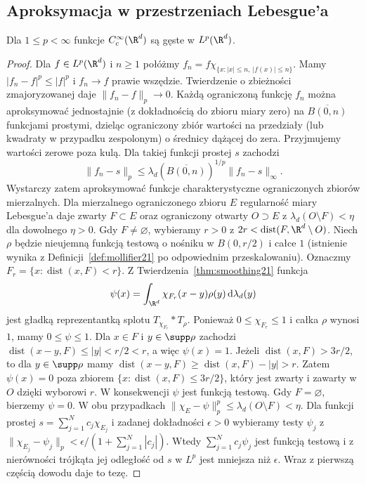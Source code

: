 
\subsection{Aproksymacja w przestrzeniach Lebesgue'a}

\begin{twierdzenie}
\label{thm:dt-test-density}
Dla $1\le p<\infty$ funkcje $C_c^\infty(\R^d)$
są gęste w $L^p(\R^d)$.
\end{twierdzenie}
\begin{proof}
Dla $f\in L^p(\R^d)$ i $n\ge1$ połóżmy
$f_n=f\chi_{\{x:|x|\le n,\ |f(x)|\le n\}}$.
Mamy $|f_n-f|^p\le |f|^p$ i $f_n\to f$ prawie wszędzie.
Twierdzenie o zbieżności zmajoryzowanej daje
$\|f_n-f\|_p\to0$.
Każdą ograniczoną funkcję $f_n$ można aproksymować
jednostajnie (z dokładnością do zbioru miary zero)
na $\overline{B(0,n)}$ funkcjami prostymi, dzieląc
ograniczony zbiór wartości na przedziały (lub kwadraty
w przypadku zespolonym) o średnicy dążącej do zera.
Przyjmujemy wartości zerowe poza kulą. Dla takiej
funkcji prostej $s$ zachodzi
\[
 \|f_n-s\|_p\le
 \lambda_d(\overline{B(0,n)})^{1/p}\|f_n-s\|_\infty.
\]
Wystarczy zatem aproksymować funkcje charakterystyczne
ograniczonych zbiorów mierzalnych.
Dla mierzalnego ograniczonego zbioru $E$ regularność
miary Lebesgue'a daje zwarty $F\subset E$ oraz
ograniczony otwarty $O\supset E$ z
$\lambda_d(O\setminus F)<\eta$ dla dowolnego $\eta>0$.
Gdy $F\ne\varnothing$, wybieramy $r>0$ z
$2r<\operatorname{dist}(F,\R^d\setminus O)$.
Niech $\rho$ będzie nieujemną funkcją testową o nośniku
w $B(0,r/2)$ i całce $1$ (istnienie wynika z
Definicji~\ref{def:mollifier21} po odpowiednim przeskalowaniu).
Oznaczmy $F_r=\{x:\operatorname{dist}(x,F)<r\}$.
Z Twierdzenia~\ref{thm:smoothing21} funkcja
\[
 \psi(x)=\int_{\R^d}\chi_{F_r}(x-y)\rho(y)
 \,\mathrm d\lambda_d(y)
\]
jest gładką reprezentantką splotu $T_{\chi_{F_r}}*T_\rho$.
Ponieważ $0\le\chi_{F_r}\le1$ i całka $\rho$ wynosi $1$,
mamy $0\le\psi\le1$.
Dla $x\in F$ i $y\in\supp\rho$ zachodzi
$\operatorname{dist}(x-y,F)\le |y|<r/2<r$,
a więc $\psi(x)=1$.
Jeżeli $\operatorname{dist}(x,F)>3r/2$, to dla
$y\in\supp\rho$ mamy
$\operatorname{dist}(x-y,F)\ge
\operatorname{dist}(x,F)-|y|>r$.
Zatem $\psi(x)=0$ poza zbiorem
$\{x:\operatorname{dist}(x,F)\le3r/2\}$,
który jest zwarty i zawarty w $O$ dzięki wyborowi $r$.
W konsekwencji $\psi$ jest funkcją testową. Gdy $F=\varnothing$,
bierzemy $\psi=0$. W obu przypadkach
$\|\chi_E-\psi\|_p^p\le\lambda_d(O\setminus F)<\eta$.
Dla funkcji prostej $s=\sum_{j=1}^N c_j\chi_{E_j}$
i zadanej dokładności $\epsilon>0$ wybieramy testy
$\psi_j$ z $\|\chi_{E_j}-\psi_j\|_p<
\epsilon/(1+\sum_{j=1}^N|c_j|)$.
Wtedy $\sum_{j=1}^Nc_j\psi_j$ jest funkcją testową
i z nierówności trójkąta jej odległość od $s$ w $L^p$
jest mniejsza niż $\epsilon$.
Wraz z pierwszą częścią dowodu daje to tezę.
\end{proof}

